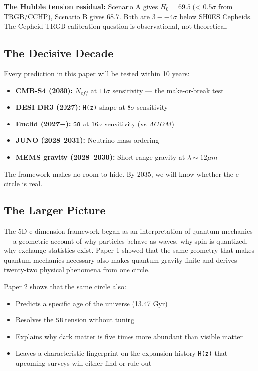 \documentclass[aps,prd,preprint,superscriptaddress,longbibliography]{revtex4-2}
\begin{document}
\textbf{The Hubble tension residual:} Scenario A gives $H_{0} = 69.5$ (< $0.5\sigma$ from TRGB/CCHP), Scenario B gives 68.7. Both are $3--4\sigma$ below SH0ES Cepheids. The Cepheid-TRGB calibration question is observational, not theoretical.


\subsection{The Decisive Decade}

Every prediction in this paper will be tested within 10 years:


\begin{itemize}
  \item \textbf{CMB-S4 (2030):} $N_{eff}$ at $11\sigma$ sensitivity --- the make-or-break test
  \item \textbf{DESI DR3 (2027):} \texttt{H(z)} shape at $8\sigma$ sensitivity
  \item \textbf{Euclid (2027+):} \texttt{S8} at $16\sigma$ sensitivity (vs $\Lambda CDM$)
  \item \textbf{JUNO (2028--2031):} Neutrino mass ordering
  \item \textbf{MEMS gravity (2028--2030):} Short-range gravity at $\lambda \sim  12 \mu m$
\end{itemize}

The framework makes no room to hide. By 2035, we will know whether the e-circle is real.


\subsection{The Larger Picture}

The 5D e-dimension framework began as an interpretation of quantum mechanics --- a geometric account of why particles behave as waves, why spin is quantized, why exchange statistics exist. Paper 1 showed that the same geometry that makes quantum mechanics necessary also makes quantum gravity finite and derives twenty-two physical phenomena from one circle.

Paper 2 shows that the same circle also:

\begin{itemize}
  \item Predicts a specific age of the universe (13.47 Gyr)
  \item Resolves the \texttt{S8} tension without tuning
  \item Explains why dark matter is five times more abundant than visible matter
  \item Leaves a characteristic fingerprint on the expansion history \texttt{H(z)} that upcoming surveys will either find or rule out
\end{itemize}
\end{document}
